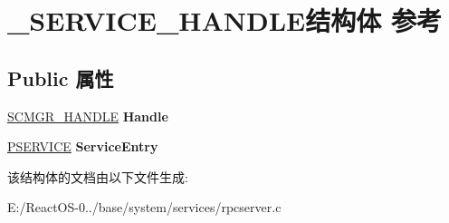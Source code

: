 \hypertarget{struct___s_e_r_v_i_c_e___h_a_n_d_l_e}{}\section{\+\_\+\+S\+E\+R\+V\+I\+C\+E\+\_\+\+H\+A\+N\+D\+L\+E结构体 参考}
\label{struct___s_e_r_v_i_c_e___h_a_n_d_l_e}
\subsection*{Public 属性}
\begin{DoxyCompactItemize}
\item 
\mbox{\label{struct___s_e_r_v_i_c_e___h_a_n_d_l_e_a1ab2b23aa02753b83e1bab197533194a}} 
\hyperlink{struct___s_c_m_g_r___h_a_n_d_l_e}{S\+C\+M\+G\+R\+\_\+\+H\+A\+N\+D\+LE} {\bfseries Handle}
\item 
\mbox{\label{struct___s_e_r_v_i_c_e___h_a_n_d_l_e_a2a05ae0a948700d462b0b9dca8c49c97}} 
\hyperlink{struct___s_e_r_v_i_c_e}{P\+S\+E\+R\+V\+I\+CE} {\bfseries Service\+Entry}
\end{DoxyCompactItemize}


该结构体的文档由以下文件生成\+:\begin{DoxyCompactItemize}
\item 
E\+:/\+React\+O\+S-\/0../base/system/services/rpcserver.\+c\end{DoxyCompactItemize}
